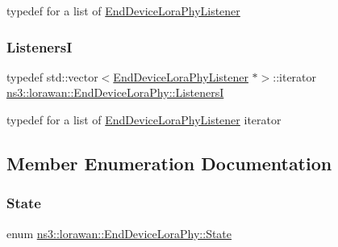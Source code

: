 typedef for a list of \hyperlink{classns3_1_1lorawan_1_1EndDeviceLoraPhyListener}{End\+Device\+Lora\+Phy\+Listener} \mbox{\label{classns3_1_1lorawan_1_1EndDeviceLoraPhy_add44ac8b9f5035a0171aee9bfa271a9c}} 
\subsubsection{\texorpdfstring{ListenersI}{ListenersI}}
{\footnotesize\ttfamily typedef std\+::vector$<$\hyperlink{classns3_1_1lorawan_1_1EndDeviceLoraPhyListener}{End\+Device\+Lora\+Phy\+Listener} $\ast$$>$\+::iterator \hyperlink{classns3_1_1lorawan_1_1EndDeviceLoraPhy_add44ac8b9f5035a0171aee9bfa271a9c}{ns3\+::lorawan\+::\+End\+Device\+Lora\+Phy\+::\+ListenersI}\hspace{0.3cm}{\ttfamily [protected]}}

typedef for a list of \hyperlink{classns3_1_1lorawan_1_1EndDeviceLoraPhyListener}{End\+Device\+Lora\+Phy\+Listener} iterator 

\subsection{Member Enumeration Documentation}
\mbox{\label{classns3_1_1lorawan_1_1EndDeviceLoraPhy_adc84e4ce7796e19f19f077df9592af15}} 
\subsubsection{\texorpdfstring{State}{State}}
{\footnotesize\ttfamily enum \hyperlink{classns3_1_1lorawan_1_1EndDeviceLoraPhy_adc84e4ce7796e19f19f077df9592af15}{ns3\+::lorawan\+::\+End\+Device\+Lora\+Phy\+::\+State}}

